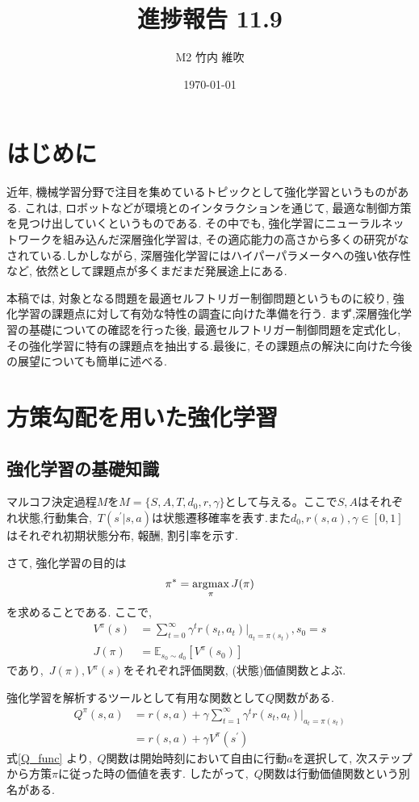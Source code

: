 \documentclass{jsarticle}
\title{\large{\bf{進捗報告 11.9}}}
\author{M2 竹内 維吹}
\date{\today}
\newcommand{\argmax}{\mathop{\rm argmax}\limits}
\newcommand{\expect}{\mathbb{E}}
\begin{document}
\maketitle


\section{はじめに}
近年, 機械学習分野で注目を集めているトピックとして強化学習というものがある. これは, ロボットなどが環境とのインタラクションを通じて, 最適な制御方策を見つけ出していくというものである. その中でも, 強化学習にニューラルネットワークを組み込んだ深層強化学習は, その適応能力の高さから多くの研究がなされている.しかしながら, 深層強化学習にはハイパーパラメータへの強い依存性など, 依然として課題点が多くまだまだ発展途上にある.\par
本稿では, 対象となる問題を最適セルフトリガー制御問題というものに絞り, 強化学習の課題点に対して有効な特性の調査に向けた準備を行う. まず,深層強化学習の基礎についての確認を行った後, 最適セルフトリガー制御問題を定式化し, その強化学習に特有の課題点を抽出する.最後に, その課題点の解決に向けた今後の展望についても簡単に述べる.

\section{方策勾配を用いた強化学習}
\subsection{強化学習の基礎知識}
マルコフ決定過程$M$を$M=\{S,A,T,d_0,r,\gamma\}$として与える。ここで$S,A$はそれぞれ状態,行動集合,~$T(s^{'}|s,a)$は状態遷移確率を表す.また$d_0,r(s,a),\gamma\in[0,1]$はそれぞれ初期状態分布, 報酬, 割引率を示す.\par
さて, 強化学習の目的は
\begin{equation}
	\pi^{*}=\argmax_{\pi}J(\pi) \label{purpose_of_rl}
\end{equation}を求めることである. ここで, 
\begin{align}
	V^{\pi}(s) &= \sum_{t=0}^{\infty}\gamma^tr(s_t, a_t)|_{a_t=\pi(s_t)}, s_0 = s\\
	J(\pi) &= \expect_{s_0\sim d_0}[V^{\pi}(s_0)]
\end{align}
であり,~$J(\pi), V^{\pi}(s)$をそれぞれ評価関数, (状態)価値関数とよぶ.\par
強化学習を解析するツールとして有用な関数として$Q$関数がある.
\begin{align}
	Q^{\pi}(s,a) &= r(s, a) + \gamma\sum_{t=1}^{\infty}\gamma^tr(s_t, a_t)|_{a_t=\pi(s_t)} \nonumber\\
			    &= r(s, a) + \gamma V^{\pi}(s^{\prime}) \label{Q_func}
\end{align}
式\eqref{Q_func} より,~$Q$関数は開始時刻において自由に行動$a$を選択して, 次ステップから方策$\pi$に従った時の価値を表す. したがって,~$Q$関数は行動価値関数という別名がある.
\end{document}
